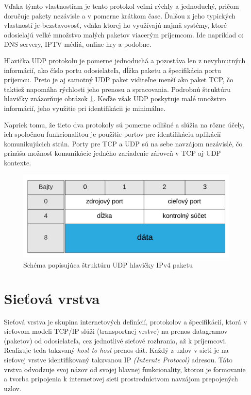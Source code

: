\documentclass[
  digital, %
  table,   %
  lof,     %
  nolot,   %
  nocover
]{fithesis3}
\begin{document}
Vďaka týmto
vlastnostiam je tento protokol veľmi rýchly a jednoduchý, pričom doručuje
pakety nezávisle a v pomerne krátkom čase. Ďalšou z jeho typických vlastností
je bezstavovosť, vďaka ktorej ho využívajú najmä systémy, ktoré odosielajú
veľké množstvo malých paketov viacerým príjemcom. Ide napríklad o: DNS servery,
IPTV médiá, online hry a podobne.

Hlavička UDP protokolu je pomerne jednoduchá a pozostáva len z nevyhnutných
informácií, ako číslo portu odosielateľa, dĺžka paketu a špecifikácia portu
príjemcu. Preto je aj samotný UDP paket viditeľne menší ako paket TCP, čo
taktiež napomáha rýchlosti jeho prenosu a spracovania. Podrobnú štruktúru hlavičky
znázorňuje obrázok \ref{fig:net-udp-head}. Keďže však UDP poskytuje
malé množstvo informácií, jeho využitie pri identifikácii je minimálne.

Napriek tomu, že tieto dva protokoly sú pomerne odlišné a slúžia na rôzne
účely, ich spoločnou funkcionalitou je použitie portov pre identifikáciu
aplikácií komunikujúcich strán. Porty pre TCP a UDP sú na sebe navzájom
nezávislé, čo prináša možnosť komunikácie jedného zariadenie zároveň v TCP aj
UDP kontexte.

\begin{figure}[H]
  \centering
    \includegraphics[width=.80\textwidth]{images/net-udp-head.png}
  \caption{Schéma popisujúca štruktúru UDP hlavičky IPv4 paketu}
  \label{fig:net-udp-head}
\end{figure}

\section{Sieťová vrstva}
Sieťová vrstva je skupina internetových definícií, protokolov a špecifikácií, ktorá
v sieťovom modeli TCP/IP slúži (transportnej vrstve) na prenos datagramov
(paketov) od odosielateľa, cez jednotlivé sieťové rozhrania, až k príjemcovi.
Realizuje teda takzvaný \textit{host-to-host} prenos dát.
Každý z uzlov v sieti je na sieťovej vrstve identifikovaný takzvanou IP
\textit{(Internte Protocol)} adresou. Táto vrstva odvodzuje svoj názov od
svojej hlavnej funkcionality, ktorou je formovanie a tvorba pripojenia k
internetovej sieti prostredníctvom navzájom prepojených uzlov.
\end{document}
